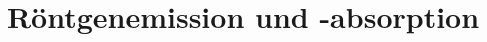 

\subject{Versuch 602}
\title{Röntgenemission und -absorption}


      \maketitle
      \thispagestyle{empty}
      \tableofcontents
      \newpage
      
      
      
      \newpage
      
      \newpage
      
      
      \printbibliography{}
      
      

